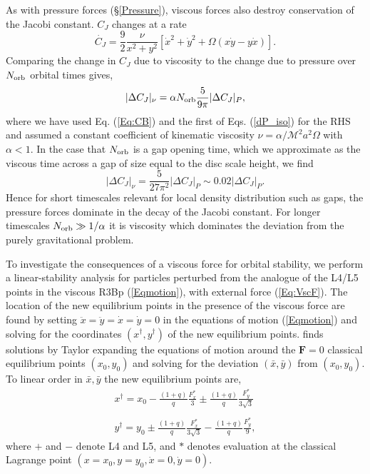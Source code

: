 \documentclass[usenatbib]{mnras}
\def\Mach{\mathcal{M}}
\begin{document}
As with pressure forces (\S \ref{Pressure}), viscous forces also destroy conservation of
the Jacobi constant. $C_J$ changes at a rate
\begin{equation}
\dot{C_J} = \frac{9}{2} \frac{\nu}{x^2+y^2} \left[ \dot{x}^2  + \dot{y}^2 + \Omega (x\dot{y} - y \dot{x}) \right].
\end{equation}
Comparing the change in $C_J$ due to viscosity to the change due to
pressure over $N_{\rm orb}$ orbital times gives,
\begin{equation}
|\Delta C_J |_{\nu} = \alpha N_{\rm orb} \frac{5}{9 \pi} |\Delta C_J |_{P},
\end{equation}
where we have used Eq. (\ref{Eq:CB}) and the first of
Eqs. (\ref{dP_iso}) for the RHS and assumed a constant coefficient of
kinematic viscosity $\nu = \alpha/\Mach^2 a^2 \Omega$ with $\alpha <
1$. In the case that $N_{\rm orb}$ is a gap opening time, which we
approximate as the viscous time across a gap of size equal to the disc
scale height, we find
\begin{equation}
|\Delta C_J |_{\nu} = \frac{5}{27 \pi^2} |\Delta C_J |_{P} \sim  0.02 |\Delta C_J |_{P}.
\end{equation}
Hence for short timescales relevant for local density distribution
such as gaps, the pressure forces dominate in the decay of the Jacobi
constant. For longer timescales $N_{\rm orb} \gg 1/\alpha$ it is viscosity which dominates
the deviation from the purely gravitational problem.
 

To investigate the consequences of a viscous force for orbital
stability, we perform a linear-stability analysis for particles
perturbed from the analogue of the L4/L5 points in the viscous R3Bp
(\ref{Eqmotion}), with external force (\ref{Eq:VscF}). The location of
the new equilibrium points in the presence of the viscous force are
found by setting $\ddot{x} = \ddot{y} = \dot{x} = \dot{y} =0$ in the
equations of motion (\ref{Eqmotion}) and solving for the coordinates
$(x^{\dagger},y^{\dagger})$ of the new equilibrium
points. \cite{Murray:1994} finds solutions by Taylor expanding the
equations of motion around the $\mathbf{F}=0$ classical equilibrium
points $(x_0,y_0)$ and solving for the deviation $(\bar{x},\bar{y})$
from $(x_0,y_0)$. To linear order in $\bar{x},\bar{y}$ the new
equilibrium points are,
\begin{equation}
\begin{array}{l}
x^\dagger = x_0 - \frac{(1+q)}{q} \frac{F^*_x}{3 } \pm  \frac{(1+q)}{q} \frac{F^*_y}{3\sqrt3 } \nonumber \\ \nonumber \\ 
y^\dagger = y_0 \pm \frac{(1+q)}{q} \frac{F^*_x}{3\sqrt3 } -  \frac{(1+q)}{q} \frac{F^*_y}{9 }, 
\label{xyDag}
\end{array}
\end{equation}
where $+$ and $-$ denote L4 and L5, and $*$ denotes evaluation at the
classical Lagrange point $(x=x_0, y=y_0, \dot{x}=0, \dot{y}=0)$.
\end{document}
